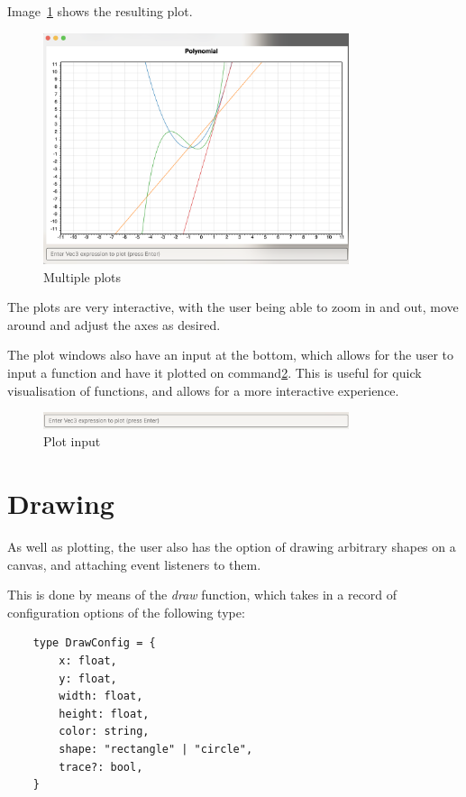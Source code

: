 Image~\ref{fig:multiple-plots} shows the resulting plot.

\begin{figure}[H]
    \centering
    \includegraphics[width=0.8\textwidth]{multiplePlots}
    \caption{Multiple plots}\label{fig:multiple-plots}
\end{figure}

The plots are very interactive, with the user being able to zoom in and out, move around and adjust the axes as
desired.

The plot windows also have an input at the bottom, which allows for the user to input a function and have it plotted
on command\ref{fig:plot-input}.
This is useful for quick visualisation of functions, and allows for a more interactive experience.

\begin{figure}[H]
    \centering
    \includegraphics[width=0.8\textwidth]{plotInput}
    \caption{Plot input}\label{fig:plot-input}
\end{figure}

\section{Drawing}\label{sec:drawing}

As well as plotting, the user also has the option of drawing arbitrary shapes on a canvas, and attaching event 
listeners to them.

This is done by means of the \textit{draw} function, which takes in a record of configuration options of the following
type:

\begin{verbatim}
    type DrawConfig = {
        x: float,
        y: float,
        width: float,
        height: float,
        color: string,
        shape: "rectangle" | "circle",
        trace?: bool, 
    }
\end{verbatim}

